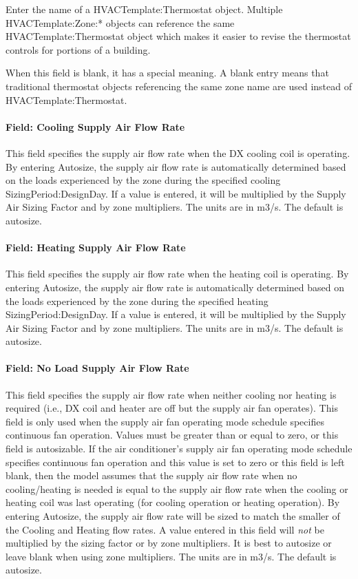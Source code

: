 Enter the name of a HVACTemplate:Thermostat object. Multiple HVACTemplate:Zone:* objects can reference the same HVACTemplate:Thermostat object which makes it easier to revise the thermostat controls for portions of a building.

When this field is blank, it has a special meaning. A blank entry means that traditional thermostat objects referencing the same zone name are used instead of HVACTemplate:Thermostat.

\paragraph{Field: Cooling Supply Air Flow Rate}\label{field-cooling-supply-air-flow-rate-1}

This field specifies the supply air flow rate when the DX cooling coil is operating. By entering Autosize, the supply air flow rate is automatically determined based on the loads experienced by the zone during the specified cooling SizingPeriod:DesignDay. If a value is entered, it will be multiplied by the Supply Air Sizing Factor and by zone multipliers. The units are in m3/s. The default is autosize.

\paragraph{Field: Heating Supply Air Flow Rate}\label{field-heating-supply-air-flow-rate-1}

This field specifies the supply air flow rate when the heating coil is operating. By entering Autosize, the supply air flow rate is automatically determined based on the loads experienced by the zone during the specified heating SizingPeriod:DesignDay. If a value is entered, it will be multiplied by the Supply Air Sizing Factor and by zone multipliers. The units are in m3/s. The default is autosize.

\paragraph{Field: No Load Supply Air Flow Rate}\label{field-no-load-supply-air-flow-rate-1}

This field specifies the supply air flow rate when neither cooling nor heating is required (i.e., DX coil and heater are off but the supply air fan operates). This field is only used when the supply air fan operating mode schedule specifies continuous fan operation. Values must be greater than or equal to zero, or this field is autosizable. If the air conditioner's supply air fan operating mode schedule specifies continuous fan operation and this value is set to zero or this field is left blank, then the model assumes that the supply air flow rate when no cooling/heating is needed is equal to the supply air flow rate when the cooling or heating coil was last operating (for cooling operation or heating operation). By entering Autosize, the supply air flow rate will be sized to match the smaller of the Cooling and Heating flow rates. A value entered in this field will \emph{not} be multiplied by the sizing factor or by zone multipliers. It is best to autosize or leave blank when using zone multipliers. The units are in m3/s. The default is autosize.

